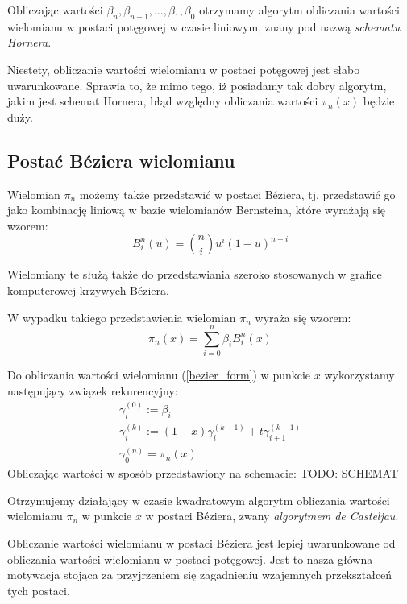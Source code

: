 \documentclass[wide, 11pt]{mwart}
\begin{document}
Obliczając wartości $\beta_n, \beta_{n-1}, \ldots, \beta_1, \beta_0$ otrzymamy
algorytm obliczania wartości wielomianu w postaci potęgowej w czasie liniowym,
znany pod nazwą \emph{schematu Hornera}.

Niestety, obliczanie wartości wielomianu w postaci potęgowej jest 
słabo uwarunkowane. Sprawia to, że mimo tego, iż posiadamy tak dobry algorytm,
jakim jest schemat Hornera, błąd względny obliczania wartości $\pi_n(x)$ będzie 
duży.

\subsection{Postać Béziera wielomianu}

Wielomian $\pi_n$ możemy także przedstawić w postaci Béziera, tj. przedstawić
go jako kombinację liniową w bazie wielomianów Bernsteina, które wyrażają się
wzorem:
\begin{equation}
  B^n_i(u) = {n \choose i}u^i(1-u)^{n-i}
\end{equation}

Wielomiany te służą także do przedstawiania szeroko stosowanych w grafice
komputerowej krzywych Béziera.

W wypadku takiego przedstawienia wielomian $\pi_n$ wyraża się wzorem:
\begin{equation}
  \label{bezier_form}
  \pi_n(x) = \sum_{i=0}^n\beta_iB^n_i(x)
\end{equation}

Do obliczania wartości wielomianu (\ref{bezier_form}) w punkcie $x$ wykorzystamy
następujący związek rekurencyjny:
\begin{subequations}
  \begin{align}
    \gamma_i^{(0)} := \beta_i\\
    \gamma_i^{(k)} := (1-x)\gamma_i^{(k-1)} + t\gamma_{i+1}^{(k-1)}\\
    \gamma_0^{(n)} = \pi_n(x)
  \end{align}
\end{subequations}
Obliczając wartości w sposób przedstawiony na schemacie:
TODO: SCHEMAT

Otrzymujemy działający w czasie kwadratowym algorytm obliczania wartości
wielomianu $\pi_n$ w punkcie $x$ w postaci Béziera, zwany 
\emph{algorytmem de Casteljau}.

Obliczanie wartości wielomianu w postaci Béziera jest lepiej uwarunkowane od
obliczania wartości wielomianu w postaci potęgowej. Jest to nasza główna
motywacja stojąca za przyjrzeniem się zagadnieniu wzajemnych przekształceń tych
postaci.
\end{document}
